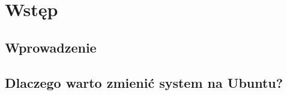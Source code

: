 \documentclass[a4paper, 11pt,oneside]{mwart}
\begin{document}


\section{Wstęp}
	\subsection{Wprowadzenie}
		
	\subsection{Dlaczego warto zmienić system na Ubuntu?}
		
		
\end{document}

